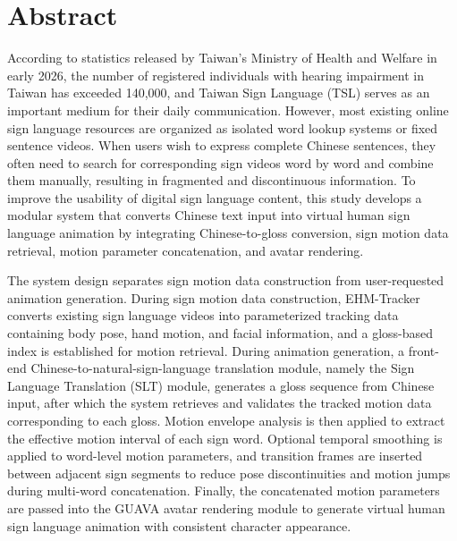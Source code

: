 \documentclass[class=NCU_thesis, crop=false]{standalone}
\begin{document}
\chapter{Abstract}
According to statistics released by Taiwan’s Ministry of Health and Welfare in early 2026, the number of registered individuals with hearing impairment in Taiwan has exceeded 140,000, and Taiwan Sign Language (TSL) serves as an important medium for their daily communication. However, most existing online sign language resources are organized as isolated word lookup systems or fixed sentence videos. When users wish to express complete Chinese sentences, they often need to search for corresponding sign videos word by word and combine them manually, resulting in fragmented and discontinuous information. To improve the usability of digital sign language content, this study develops a modular system that converts Chinese text input into virtual human sign language animation by integrating Chinese-to-gloss conversion, sign motion data retrieval, motion parameter concatenation, and avatar rendering.

The system design separates sign motion data construction from user-requested animation generation. During sign motion data construction, EHM-Tracker converts existing sign language videos into parameterized tracking data containing body pose, hand motion, and facial information, and a gloss-based index is established for motion retrieval. During animation generation, a front-end Chinese-to-natural-sign-language translation module, namely the Sign Language Translation (SLT) module, generates a gloss sequence from Chinese input, after which the system retrieves and validates the tracked motion data corresponding to each gloss. Motion envelope analysis is then applied to extract the effective motion interval of each sign word. Optional temporal smoothing is applied to word-level motion parameters, and transition frames are inserted between adjacent sign segments to reduce pose discontinuities and motion jumps during multi-word concatenation. Finally, the concatenated motion parameters are passed into the GUAVA avatar rendering module to generate virtual human sign language animation with consistent character appearance.
\end{document}
